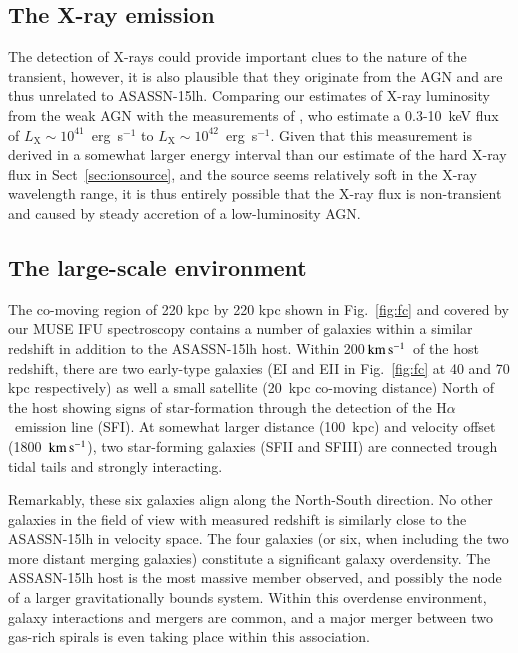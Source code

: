 \documentclass[traditabstract]{aa}
\newcommand{\kms}{$\rm{km\,s^{-1}}$}
\newcommand{\ha}{H$\alpha$}
\begin{document}
\subsection{The X-ray emission}

The detection of X-rays \citep{2017ApJ...836...25M} could provide important clues to the nature of the transient, however, it is also plausible that they originate from the AGN and are thus unrelated to ASASSN-15lh. Comparing our estimates of X-ray luminosity from the weak AGN with the measurements of \citet{2017ApJ...836...25M}, who estimate a 0.3-10~keV flux of $L_{\mathrm{X}}\sim10^{41}$~erg~s$^{-1}$ to $L_{\mathrm{X}}\sim10^{42}$~erg~s$^{-1}$. Given that this measurement is derived in a somewhat larger energy interval than our estimate of the hard X-ray flux in Sect~\ref{sec:ionsource}, and the source seems relatively soft in the X-ray wavelength range, it is thus entirely possible that the X-ray flux is non-transient and caused by steady accretion of a low-luminosity AGN. 

\subsection{The large-scale environment}

The co-moving region of 220 kpc by 220 kpc shown in Fig.~\ref{fig:fc} and covered by our MUSE IFU spectroscopy contains a number of  galaxies within a similar redshift in addition to the ASASSN-15lh host. Within 200\,\kms~of the host redshift, there are two early-type galaxies (EI and EII in Fig.~\ref{fig:fc} at 40 and 70 kpc respectively) as well a small satellite (20~kpc co-moving distance) North of the host showing signs of star-formation through the detection of the \ha~emission line (SFI). At somewhat larger distance (100~kpc) and velocity offset (1800~\kms), two star-forming galaxies (SFII and SFIII) are connected trough tidal tails and strongly interacting.

Remarkably, these six galaxies align along the North-South direction. No other galaxies in the field of view with measured redshift is similarly close to the ASASSN-15lh in velocity space. The four galaxies (or six, when including the two more distant merging galaxies) constitute a significant galaxy overdensity. The ASSASN-15lh host is the most massive member observed, and possibly the node of a larger gravitationally bounds system. Within this overdense environment, galaxy interactions and mergers are common, and a major merger between two gas-rich spirals is even taking place within this association. 
\end{document}
